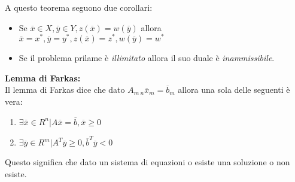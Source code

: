 \documentclass{article}
\begin{document}
A questo teorema seguono due corollari:
\begin{itemize}
  \item Se $\overline{x} \in X, \overline{y} \in Y, z(\overline{x})=w(\overline{y})$ allora $\overline{x}=x^{\ast}, \overline{y}=y^{\ast}, z(\overline{x})=z^{\ast}, w(\overline{y})=w^{\ast}$
  \item Se il problema prilame è \textit{illimitato} allora il suo duale è \textit{inammissibile}.
\end{itemize}
\textbf{Lemma di Farkas:}\\
Il lemma di Farkas dice che dato $A_{m\ n}\overline{x}_m=\overline{b}_m$ allora una sola delle seguenti è vera:
\begin{enumerate}
  \item $\exists\overline{x} \in R^n|A\overline{x}=\overline{b}, \overline{x}\ge 0$
  \item $\exists\overline{y} \in R^m|A^T\overline{y}\ge 0, \overline{b}^T\overline{y} < 0$
\end{enumerate}
Questo significa che dato un sistema di equazioni o esiste una soluzione o non esiste.
\end{document}
